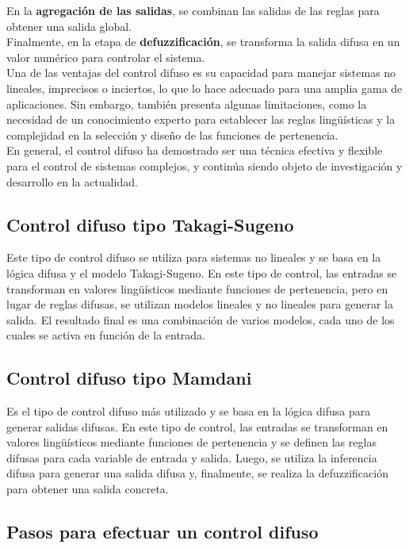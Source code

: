 \documentclass[oneside,onecolumn]{article}
\begin{document}
En la \textbf{agregación de las salidas}, se combinan las salidas de las reglas para obtener una salida global.\\

Finalmente, en la etapa de \textbf{defuzzificación}, se transforma la salida difusa en un valor numérico para controlar el sistema.\\

Una de las ventajas del control difuso es su capacidad para manejar sistemas no lineales, imprecisos o inciertos, lo que lo hace adecuado para una amplia gama de aplicaciones. Sin embargo, también presenta algunas limitaciones, como la necesidad de un conocimiento experto para establecer las reglas lingüísticas y la complejidad en la selección y diseño de las funciones de pertenencia.\\

En general, el control difuso ha demostrado ser una técnica efectiva y flexible para el control de sistemas complejos, y continúa siendo objeto de investigación y desarrollo en la actualidad.\\

\subsection{Control difuso tipo Takagi-Sugeno}
Este tipo de control difuso se utiliza para sistemas no lineales y se basa en la lógica difusa y el modelo Takagi-Sugeno. En este tipo de control, las entradas se transforman en valores lingüísticos mediante funciones de pertenencia, pero en lugar de reglas difusas, se utilizan modelos lineales y no lineales para generar la salida. El resultado final es una combinación de varios modelos, cada uno de los cuales se activa en función de la entrada.

\subsection{Control difuso tipo Mamdani}
Es el tipo de control difuso más utilizado y se basa en la lógica difusa para generar salidas difusas. En este tipo de control, las entradas se transforman en valores lingüísticos mediante funciones de pertenencia y se definen las reglas difusas para cada variable de entrada y salida. Luego, se utiliza la inferencia difusa para generar una salida difusa y, finalmente, se realiza la defuzzificación para obtener una salida concreta.

\subsection{Pasos para efectuar un control difuso}
\end{document}

